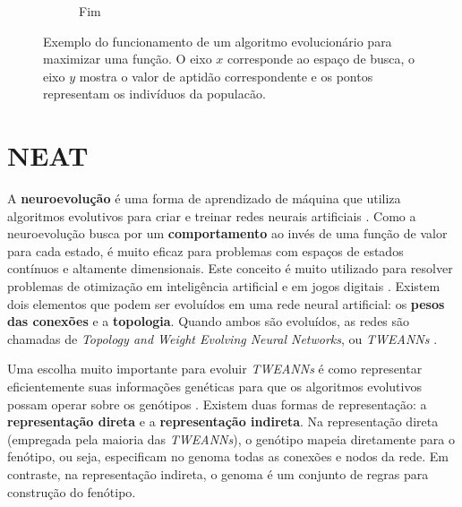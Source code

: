 \begin{figure}[htb!]
\begin{subfigure}[b]{0.3\textwidth}
		\caption{Fim}
		\label{fig:evolutionary-algorithms-function-end}
	\end{subfigure}
	\caption{Exemplo do funcionamento de um algoritmo evolucionário para
	maximizar uma função. O eixo $x$ corresponde ao espaço de busca, o eixo $y$
	mostra o valor de aptidão correspondente e os pontos representam os
	indivíduos da populacão.}
	\label{fig:evolutionary-algorithms-function}
\end{figure}


\section{\label{section:neat}NEAT}
A \textbf{neuroevolução} é uma forma de aprendizado de máquina que utiliza
algoritmos evolutivos para criar e treinar redes neurais artificiais \cite[Cap.
4]{HandbookNeuroevolution}. Como a neuroevolução busca por um
\textbf{comportamento} ao invés de uma função de valor para cada estado, é muito
eficaz para problemas com espaços de estados contínuos e altamente dimensionais.
Este conceito é muito utilizado para resolver problemas de otimização em
inteligência artificial e em jogos digitais \cite{DBLP:journals/corr/RisiT14}.
Existem dois elementos que podem ser evoluídos em uma rede neural artificial: os
\textbf{pesos das conexões} e a \textbf{topologia}. Quando ambos são evoluídos,
as redes são chamadas de \textit{Topology and Weight Evolving Neural Networks},
ou \textit{TWEANNs} \cite[Cap. 4]{HandbookNeuroevolution}.

Uma escolha muito importante para evoluir \textit{TWEANNs} é como representar
eficientemente suas informações genéticas para que os algoritmos evolutivos
possam operar sobre os genótipos \cite[Cap. 4]{HandbookNeuroevolution}. Existem
duas formas de representação: a \textbf{representação direta} e a
\textbf{representação indireta}. Na representação direta (empregada pela maioria
das \textit{TWEANNs}), o genótipo mapeia diretamente para o fenótipo, ou seja,
especificam no genoma todas as conexões e nodos da rede. Em contraste, na
representação indireta, o genoma é um conjunto de regras para construção do
fenótipo. 

